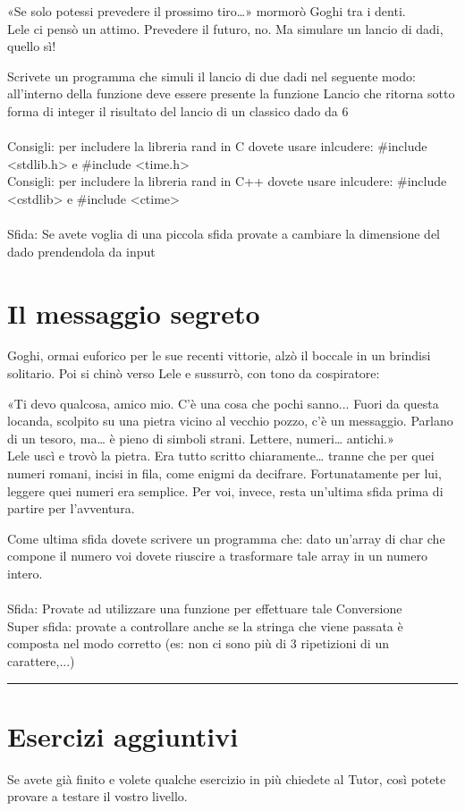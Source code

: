 \documentclass[a4paper]{article}
\begin{document}
«Se solo potessi prevedere il prossimo tiro…» mormorò Goghi tra i denti.\\
Lele ci pensò un attimo. Prevedere il futuro, no. Ma simulare un lancio di dadi, quello sì!

Scrivete un programma che simuli il lancio di due dadi nel seguente modo: all'interno della funzione deve essere presente la funzione Lancio che ritorna sotto forma di integer il risultato del lancio di un classico dado da 6\\
\\
Consigli: per includere la libreria rand in C dovete usare inlcudere: \#include <stdlib.h> e \#include <time.h>\\
Consigli: per includere la libreria rand in C++ dovete usare inlcudere: \#include <cstdlib> e \#include <ctime>\\
\\
Sfida: Se avete voglia di una piccola sfida provate a cambiare la dimensione del dado prendendola da input

\section*{Il messaggio segreto}
Goghi, ormai euforico per le sue recenti vittorie, alzò il boccale in un brindisi solitario. Poi si chinò verso Lele e sussurrò, con tono da cospiratore:

«Ti devo qualcosa, amico mio. C’è una cosa che pochi sanno... Fuori da questa locanda, scolpito su una pietra vicino al vecchio pozzo, c’è un messaggio. Parlano di un tesoro, ma… è pieno di simboli strani. Lettere, numeri… antichi.»\\
Lele uscì e trovò la pietra. Era tutto scritto chiaramente… tranne che per quei numeri romani, incisi in fila, come enigmi da decifrare.
Fortunatamente per lui, leggere quei numeri era semplice. Per voi, invece, resta un’ultima sfida prima di partire per l’avventura.

Come ultima sfida dovete scrivere un programma che: dato un'array di char che compone il numero voi dovete riuscire a trasformare tale array in un numero intero.\\
\\
Sfida: Provate ad utilizzare una funzione per effettuare tale Conversione\\
Super sfida: provate a controllare anche se la stringa che viene passata è composta nel modo corretto (es: non ci sono più di 3 ripetizioni di un carattere,...)

\noindent\rule{\linewidth}{0.4pt}
\section*{Esercizi aggiuntivi}
Se avete già finito e volete qualche esercizio in più chiedete al Tutor, così potete provare a testare il vostro livello.
\end{document}
